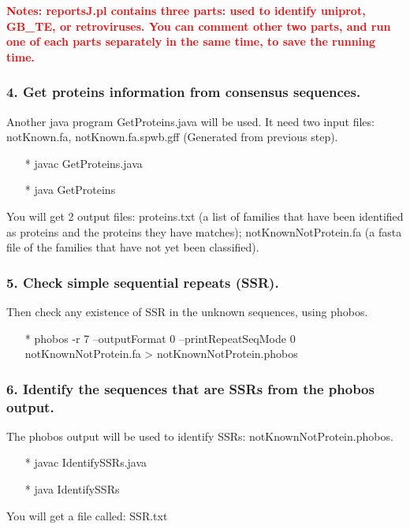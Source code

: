 \documentclass[12pt]{report}
\begin{document}
\textbf{\textcolor{red}{Notes: reportsJ.pl contains three parts: used to identify uniprot, GB\_TE, or retroviruses. You can comment other two parts, and run one of each parts separately in the same time, to save the running time.}}

\subsubsection{4. Get proteins information from consensus sequences.}
Another java program GetProteins.java will be used. It need two input files: notKnown.fa, notKnown.fa.spwb.gff (Generated from previous step).
\begin{enumerate}
	\item[*] javac GetProteins.java
	\item[*] java GetProteins
\end{enumerate}
You will get 2 output files: proteins.txt (a list of families that have been identified as proteins and the proteins they have matches);
notKnownNotProtein.fa (a fasta file of the families that have not yet been classified).

\subsubsection{5. Check simple sequential repeats (SSR).}
Then check any existence of SSR in the unknown sequences, using phobos.
\begin{enumerate}
	\item[*] phobos -r 7 --outputFormat 0 --printRepeatSeqMode 0 notKnownNotProtein.fa > notKnownNotProtein.phobos
\end{enumerate}

\subsubsection{6. Identify the sequences that are SSRs from the phobos output.}
The phobos output will be used to identify SSRs: notKnownNotProtein.phobos.
\begin{enumerate}
	\item[*] javac IdentifySSRs.java
	\item[*] java IdentifySSRs
\end{enumerate}
You will get a file called: SSR.txt
\end{document}
